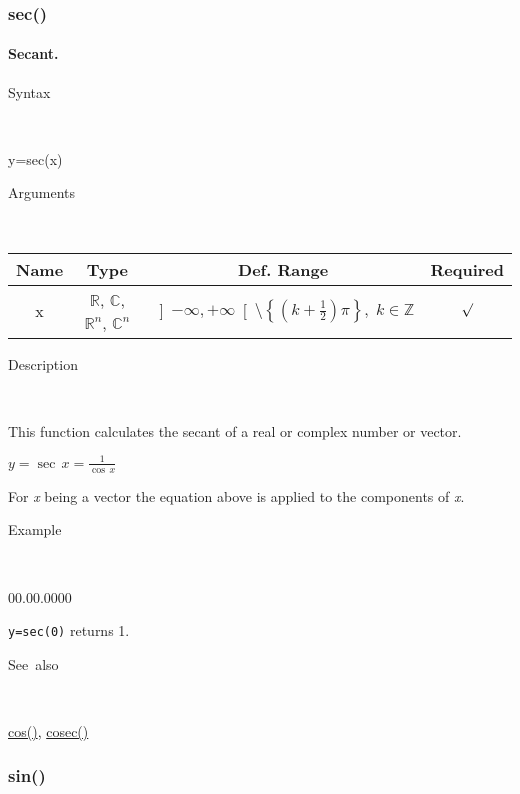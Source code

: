 \newpage
\subsubsection*{\hypertarget{sec}{}{\Large sec()}}


\paragraph{\label{par:Secant}Secant.}

\begin{description}
\item [Syntax]~
\end{description}
y=sec(x)

\begin{description}
\item [Arguments]~
\end{description}
\begin{tabular}{|c|c|c|c|}
\hline 
Name&
Type&
Def. Range&
Required\tabularnewline
\hline
\hline 
x&
$\mathbb{R}$, $\mathbb{C}$, $\mathbb{R}^{n}$, $\mathbb{C}^{n}$&
$\left]-\infty,+\infty\right[\setminus\left\{ \left(k+\frac{1}{2}\right)\pi\right\} ,\; k\in\mathbb{Z}$&
$\surd$\tabularnewline
\hline
\end{tabular}

\begin{description}
\item [Description]~
\end{description}
This function calculates the secant of a real or complex number or
vector.

\medskip{}
$y=$$\sec\, x$$={\displaystyle \frac{1}{\cos\, x}}$
\medskip{}

For \textit{x} being a vector the equation above is applied
to the components of \textit{x}.

\begin{description}
\item [Example]~
\end{description}
\begin{lyxlist}{00.00.0000}
\item [\texttt{y=sec(0)}]returns 1.
\end{lyxlist}
\begin{description}
\item [See~also]~
\end{description}
\textcolor{blue}{\hyperlink{cos}{cos()}}\textcolor{black}{,} \textcolor{blue}{\hyperlink{cosec}{cosec()}}


\newpage
\subsubsection*{\hypertarget{sin}{}{\Large sin()}}


